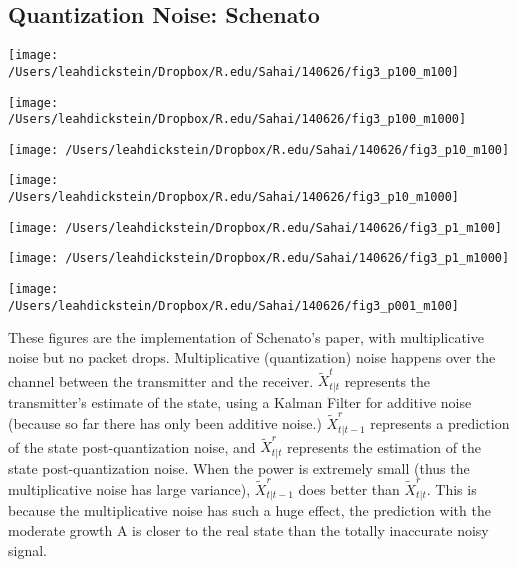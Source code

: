 \documentclass[leqno,twocolumn]{article}
\begin{document}
\subsection{Quantization Noise: Schenato}
\begin{minipage}[c]{0.5\textwidth}
\texttt{[image: /Users/leahdickstein/Dropbox/R.edu/Sahai/140626/fig3\_p100\_m100]}
\end{minipage}
\begin{minipage}[c]{0.5\textwidth}
\texttt{[image: /Users/leahdickstein/Dropbox/R.edu/Sahai/140626/fig3\_p100\_m1000]}
\end{minipage}

\begin{minipage}[c]{0.5\textwidth}
\texttt{[image: /Users/leahdickstein/Dropbox/R.edu/Sahai/140626/fig3\_p10\_m100]}
\end{minipage}
\begin{minipage}[c]{0.5\textwidth}
\texttt{[image: /Users/leahdickstein/Dropbox/R.edu/Sahai/140626/fig3\_p10\_m1000]}
\end{minipage}

\begin{minipage}[c]{0.5\textwidth}
\texttt{[image: /Users/leahdickstein/Dropbox/R.edu/Sahai/140626/fig3\_p1\_m100]}
\end{minipage}
\begin{minipage}[c]{0.5\textwidth}
\texttt{[image: /Users/leahdickstein/Dropbox/R.edu/Sahai/140626/fig3\_p1\_m1000]}
\end{minipage}

\begin{minipage}[c]{0.5\textwidth}
\texttt{[image: /Users/leahdickstein/Dropbox/R.edu/Sahai/140626/fig3\_p001\_m100]}
\end{minipage}
\begin{minipage}[b]{0.5\textwidth}
These figures are the implementation of Schenato's paper, with multiplicative noise but no packet drops. Multiplicative (quantization) noise happens over the channel between the transmitter and the receiver. $\tilde{X}^t_{t|t}$ represents the transmitter's estimate of the state, using a Kalman Filter for additive noise (because so far there has only been additive noise.) $\tilde{X}^r_{t|t-1}$ represents a prediction of the state post-quantization noise, and $\tilde{X}^r_{t|t}$ represents the estimation of the state post-quantization noise. When the power is extremely small (thus the multiplicative noise has large variance), $\tilde{X}^r_{t|t-1}$ does better than $\tilde{X}^r_{t|t}$. This is because the multiplicative noise has such a huge effect, the prediction with the moderate growth A is closer to the real state than the totally inaccurate noisy signal.
\end{minipage}
\end{document}
